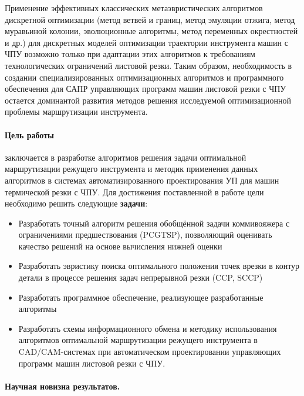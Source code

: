 Применение эффективных классических метаэвристических алгоритмов дискретной оптимизации
(метод ветвей и границ, метод эмуляции отжига, метод муравьиной колонии, эволюционные алгоритмы, метод переменных окрестностей и др.)
для дискретных моделей оптимизации траектории инструмента машин с ЧПУ
возможно только при адаптации этих алгоритмов к требованиям технологических ограничений листовой резки.
Таким образом,
необходимость в создании специализированных оптимизационных
алгоритмов и программного обеспечения
для САПР управляющих программ машин листовой резки с ЧПУ
остается
доминантой развития методов решения исследуемой оптимизационной проблемы
маршрутизации инструмента.

\paragraph*{Цель работы}
заключается в разработке алгоритмов решения задачи оптимальной
маршрутизации режущего инструмента
и методик применения данных алгоритмов
в системах автоматизированного проектирования УП для машин термической резки с ЧПУ.
Для достижения поставленной в работе цели необходимо решить следующие
\textbf{задачи}:

\begin{itemize}
  \item
    Разработать точный алгоритм решения
    обобщённой задачи коммивояжера
    с ограничениями предшествования (PCGTSP),
    позволяющий оценивать качество решений
    на основе вычисления нижней оценки
  \item
    Разработать эвристику поиска оптимального положения
    точек врезки в контур детали в процессе решения задач
    непрерывной резки
    (CCP, SCCP)
  \item
    Разработать программное обеспечение,
    реализующее разработанные алгоритмы
  \item
    Разработать схемы информационного обмена
    и методику использования алгоритмов
    оптимальной маршрутизации режущего инструмента
    в CAD/CAM-системах
    при автоматическом проектировании
    управляющих программ
    машин листовой резки с ЧПУ.
\end{itemize}

\paragraph*{Научная новизна результатов.}


